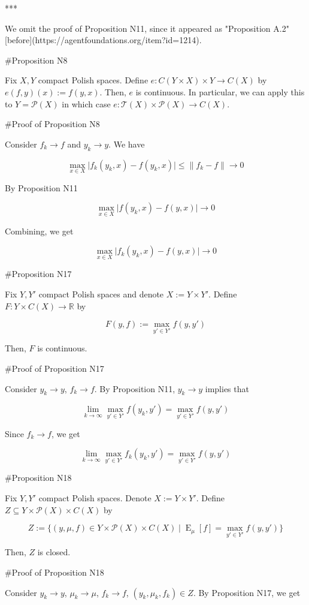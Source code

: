 \documentclass[a4paper]{article}
\DeclareMathOperator{\E}{E}
\newcommand{\Reals}{\mathbb{R}}
\newcommand{\Abs}[1]{\lvert #1 \rvert}
\newcommand{\Norm}[1]{\lVert #1 \rVert}
\newcommand{\Prob}{\mathcal{P}}
\newcommand{\T}{\mathcal{T}}
\begin{document}
***

We omit the proof of Proposition N11, since it appeared as "Proposition A.2" [before](https://agentfoundations.org/item?id=1214).

\#Proposition N8

Fix ${X,Y}$ compact Polish spaces. Define ${e: C(Y \times X) \times Y \rightarrow C(X)}$ by ${e(f,y)(x):=f(y,x)}$. Then, ${e}$ is continuous. In particular, we can apply this to ${Y = \Prob(X)}$ in which case ${e: \T(X) \times \Prob(X) \rightarrow C(X)}$.

\#Proof of Proposition N8

Consider ${f_k \rightarrow f}$ and ${y_k \rightarrow y}$. We have

$$\max_{x \in X} \Abs{f_k(y_k,x)-f(y_k,x)} \leq \Norm{f_k - f} \rightarrow 0$$

By Proposition N11

$$\max_{x \in X} \Abs{f(y_k,x)-f(y,x)} \rightarrow 0$$

Combining, we get

$$\max_{x \in X} \Abs{f_k(y_k,x)-f(y,x)} \rightarrow 0$$

\#Proposition N17

Fix ${Y,Y'}$ compact Polish spaces and denote ${X:=Y \times Y'}$. Define ${F: Y \times C(X) \rightarrow \Reals}$ by 

$${F(y,f):=\max_{y' \in Y'} f(y,y')}$$

Then, ${F}$ is continuous.

\#Proof of Proposition N17

Consider ${y_k \rightarrow y}$, ${f_k \rightarrow f}$. By Proposition N11, ${y_k \rightarrow y}$ implies that

$${\lim_{k \rightarrow \infty} \max_{y' \in Y'} f(y_k,y') = \max_{y' \in Y'} f(y,y')}$$

Since ${f_k \rightarrow f}$, we get

$${\lim_{k \rightarrow \infty} \max_{y' \in Y'} f_k(y_k,y') = \max_{y' \in Y'} f(y,y')}$$

\#Proposition N18

Fix ${Y,Y'}$ compact Polish spaces. Denote ${X:=Y \times Y'}$. Define ${Z \subseteq Y \times \Prob(X) \times C(X)}$ by

$$Z:=\{(y,\mu,f) \in Y \times \Prob(X) \times C(X) \mid \E_\mu[f] = \max_{y' \in Y'} f(y,y')\}$$

Then, ${Z}$ is closed.

\#Proof of Proposition N18

Consider ${y_k \rightarrow y}$, ${\mu_k \rightarrow \mu}$, ${f_k \rightarrow f}$, ${(y_k,\mu_k,f_k) \in Z}$. By Proposition N17, we get
\end{document}
